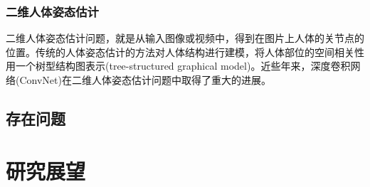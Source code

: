 \begin{refsection}
\subsubsection{二维人体姿态估计}
二维人体姿态估计问题，就是从输入图像或视频中，得到在图片上人体的关节点的位置。传统的人体姿态估计的方法对人体结构进行建模，将人体部位的空间相关性用一个树型结构图表示(tree-structured graphical model)\autocite{eichner20122d}。近些年来，深度卷积网络(ConvNet)在二维人体姿态估计问题中取得了重大的进展。

\subsection{存在问题}

\section{研究展望}

\newpage
\printbibliography
\end{refsection}
